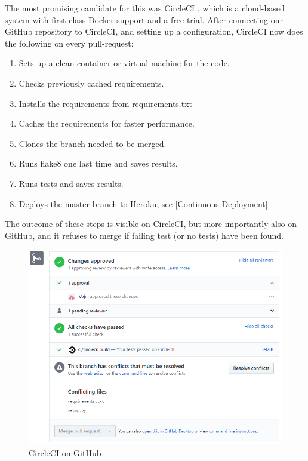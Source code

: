 \documentclass[main.tex]{subfiles}
\begin{document}
The most promising candidate for this was CircleCI \cite{CircleCI}, which is a cloud-based system with first-class Docker support and a free trial. After connecting our GitHub repository to CircleCI, and setting up a configuration, CircleCI now does the following on every pull-request:

\begin{enumerate}
    \item Sets up a clean container or virtual machine for the code.
    \item Checks previously cached requirements. 
    \item Installs the requirements from requirements.txt
    \item Caches the requirements for faster performance.
    \item Clones the branch needed to be merged.
    \item Runs flake8 one last time and saves results.
    \item Runs tests and saves results. 
    \item Deploys the master branch to Heroku, see \ref{Continuous Deployment}
\end{enumerate}

The outcome of these steps is visible on CircleCI, but more importantly also on GitHub, and it refuses to merge if failing test (or no tests) have been found. 

 \begin{figure}[H]
   \centering
   \includegraphics[scale=0.6]{05Coding/05Pictures/circleCI.png}
   \caption{CircleCI on GitHub}
   \label{CircleCI}
\end{figure}
\end{document}

